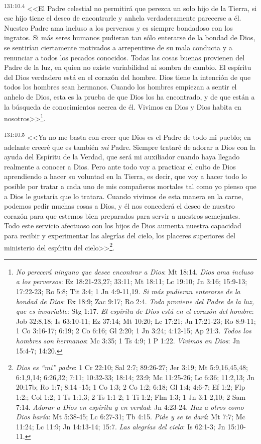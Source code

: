 \par 
\textsuperscript{131:10.4} <<El Padre celestial no permitirá que perezca un solo hijo de la Tierra, si ese hijo tiene el deseo de encontrarle y anhela verdaderamente parecerse a él. Nuestro Padre ama incluso a los perversos y es siempre bondadoso con los ingratos. Si más seres humanos pudieran tan sólo enterarse de la bondad de Dios, se sentirían ciertamente motivados a arrepentirse de su mala conducta y a renunciar a todos los pecados conocidos. Todas las cosas buenas provienen del Padre de la luz, en quien no existe variabilidad ni sombra de cambio. El espíritu del Dios verdadero está en el corazón del hombre. Dios tiene la intención de que todos los hombres sean hermanos. Cuando los hombres empiezan a sentir el anhelo de Dios, esta es la prueba de que Dios los ha encontrado, y de que están a la búsqueda de conocimientos acerca de él. Vivimos en Dios y Dios habita en nosotros>>\footnote{\textit{No perecerá ninguno que desee encontrar a Dios}: Mt 18:14. \textit{Dios ama incluso a los perversos}: Ez 18:21-23,27; 33:11; Mt 18:11; Lc 19:10; Jn 3:16; 15:9-13; 17:22-23; Ro 5:8; Tit 3:4; 1 Jn 4:9-11,19. \textit{Si más pudieran enterarse de la bondad de Dios}: Ex 18:9; Zac 9:17; Ro 2:4. \textit{Todo proviene del Padre de la luz, que es invariable}: Stg 1:17. \textit{El espíritu de Dios está en el corazón del hombre}: Job 32:8,18; Is 63:10-11; Ez 37:14; Mt 10:20; Lc 17:21; Jn 17:21-23; Ro 8:9-11; 1 Co 3:16-17; 6:19; 2 Co 6:16; Gl 2:20; 1 Jn 3:24; 4:12-15; Ap 21:3. \textit{Todos los hombres son hermanos}: Mc 3:35; 1 Ts 4:9; 1 P 1:22. \textit{Vivimos en Dios}: Jn 15:4-7; 14:20.}.

\par 
\textsuperscript{131:10.5} <<Ya no me basta con creer que Dios es el Padre de todo mi pueblo; en adelante creeré que es también \textit{mi} Padre. Siempre trataré de adorar a Dios con la ayuda del Espíritu de la Verdad, que será mi auxiliador cuando haya llegado realmente a conocer a Dios. Pero ante todo voy a practicar el culto de Dios aprendiendo a hacer su voluntad en la Tierra, es decir, que voy a hacer todo lo posible por tratar a cada uno de mis compañeros mortales tal como yo pienso que a Dios le gustaría que lo tratara. Cuando vivimos de esta manera en la carne, podemos pedir muchas cosas a Dios, y él nos concederá el deseo de nuestro corazón para que estemos bien preparados para servir a nuestros semejantes. Todo este servicio afectuoso con los hijos de Dios aumenta nuestra capacidad para recibir y experimentar las alegrías del cielo, los placeres superiores del ministerio del espíritu del cielo>>\footnote{\textit{Dios es ``mi'' padre}: 1 Cr 22:10; Sal 2:7; 89:26-27; Jer 3:19; Mt 5:9,16,45,48; 6:1,9,14; 6:26,32; 7:11; 10:32-33; 18:14; 23:9; Mc 11:25-26; Lc 6:36; 11:2,13; Jn 20:17b; Ro 1:7; 8:14 -15; 1 Co 1:3; 2 Co 1:2; 6:18; Gl 1:4; 4:6-7; Ef 1:2; Flp 1:2:; Col 1:2; 1 Ts 1:1,3; 2 Ts 1:1-2; 1 Ti 1:2; Flm 1:3; 1 Jn 3:1-2,10; 2 Sam 7:14. \textit{Adorar a Dios en espíritu y en verdad}: Jn 4:23-24. \textit{Haz a otros como Dios haría}: Mt 5:38-45; Lc 6:27-31; Tb 4:15. \textit{Pide y se te dará}: Mt 7:7; Mc 11:24; Lc 11:9; Jn 14:13-14; 15:7. \textit{Las alegrías del cielo}: Is 62:1-3; Jn 15:10-11.}.

